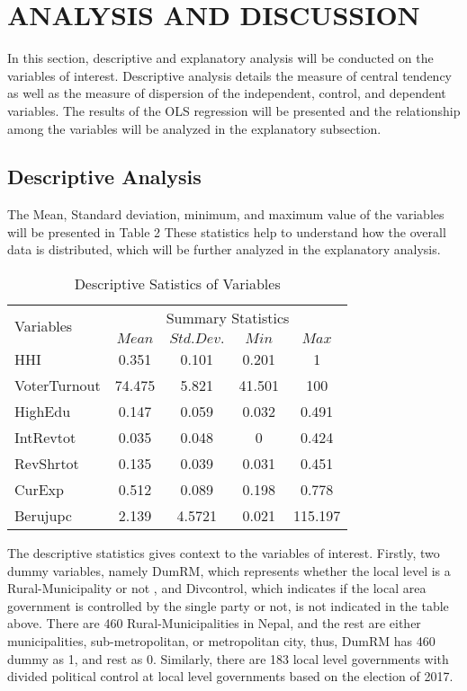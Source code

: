 \newpage
\section{ANALYSIS AND DISCUSSION}
In this section, descriptive and explanatory analysis will be conducted on the variables of interest. Descriptive analysis details the measure of central tendency as well as the measure of dispersion of the independent, control, and dependent variables. The results of the OLS regression will be presented and the relationship among the variables will be analyzed in the explanatory subsection.
\vspace{-3mm}
\subsection{Descriptive Analysis}
The Mean, Standard deviation, minimum, and maximum value of the variables will be presented in Table 2
These statistics help to understand how the overall data is distributed, which will be further analyzed in the explanatory analysis.
\begin{table}[H]
  \centering
   \begin{tabular}{lcccc}
    \hline
    \multirow{2}{*}{Variables} &\multicolumn{4}{c}{Summary Statistics}\\&{$Mean$} & {$Std. Dev.$}  & {$Min$} & {$Max$} \\
        \hline
    HHI & 0.351 &0.101&  0.201  & 1\\
    VoterTurnout & 74.475 &5.821 &  41.501&100 \\
    HighEdu & 0.147 & 0.059& 0.032& 0.491\\
    IntRevtot &0.035 &0.048 &0 &0.424\\
    RevShrtot & 0.135 &0.039& 0.031  & 0.451\\
    CurExp & 0.512& 0.089& 0.198   & 0.778\\
    Berujupc & 2.139& 4.5721& 0.021  & 115.197\\
    \hline
    \end{tabular}
    \caption{Descriptive Satistics of Variables }  
     \label{Descriptive Statistics of Variables }
\end{table} 
The descriptive statistics gives context to the variables of interest. Firstly, two dummy variables, namely DumRM, which represents whether the local level is a Rural-Municipality or not , and Divcontrol, which indicates if the local area government is controlled by the single party or not, is not indicated in the table above. There are 460 Rural-Municipalities in Nepal, and the rest are either municipalities, sub-metropolitan, or metropolitan city, thus, DumRM has 460 dummy as 1, and rest as 0. Similarly, there are 183 local level governments with divided political control at local level governments based on the election of 2017. \\
